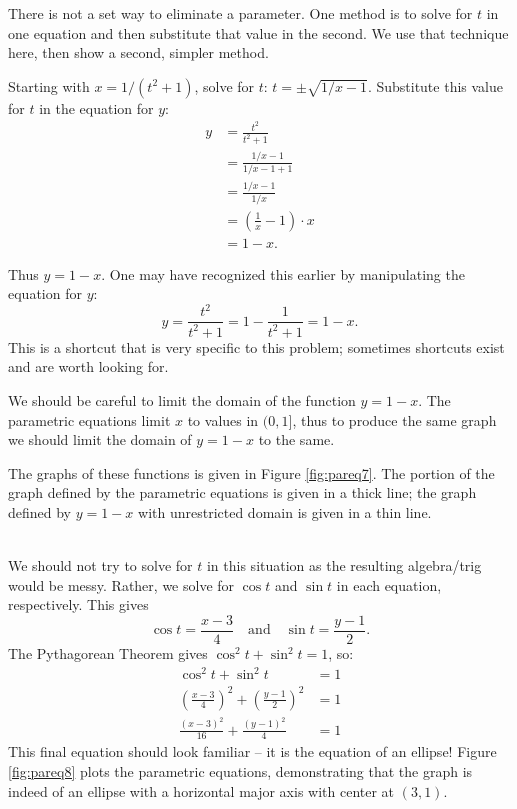 {There is not a set way to eliminate a parameter. One method is to solve for $t$ in one equation and then substitute that value in the second. We use that technique here, then show a second, simpler method.

Starting with $x= 1/(t^2+1)$, solve for $t$: $ t = \pm\sqrt{1/x-1}$. Substitute this value for $t$ in the equation for $y$:
\begin{align*}
 y &= \frac{t^2}{t^2 +1} \\
		&= \frac{1/x-1}{1/x-1+1} \\
		&= \frac{1/x - 1}{1/x} \\
		&= \left(\frac1x-1\right)\cdot x \\
		&= 1-x.
\end{align*}

Thus $y=1-x$. One may have recognized this earlier by manipulating the equation for $y$:
$$y = \frac{t^2}{t^2+1} = 1-\frac{1}{t^2+1} = 1-x.$$ This is a shortcut that is very specific to this problem; sometimes shortcuts exist and are worth looking for.

We should be careful to limit the domain of the function $y=1-x$. The parametric equations limit $x$ to values in $(0,1]$, thus to produce the same graph we should limit the domain of $y=1-x$ to the same. 

The graphs of these functions is given in Figure \ref{fig:pareq7}. The portion of the graph defined by the parametric equations is given in a thick line; the graph defined by $y=1-x$ with unrestricted domain is given in a thin line.
}\\

{We should not try to solve for $t$ in this situation as the resulting algebra/trig would be messy. Rather, we solve for $\cos t$ and $\sin t$ in each equation, respectively. This gives $$\cos t = \frac{x-3}{4} \quad \text{and}\quad \sin t=\frac{y-1}{2}.$$
The Pythagorean Theorem gives $\cos^2t+\sin^2t=1$, so:
\begin{align*}
\cos^2t+\sin^2t &=1 \\
\left(\frac{x-3}{4}\right)^2 +\left(\frac{y-1}{2}\right)^2 &=1\\
\frac{(x-3)^2}{16}+\frac{(y-1)^2}{4} &=1
\end{align*}
This final equation should look familiar -- it is the equation of an ellipse! Figure \ref{fig:pareq8} plots the parametric equations, demonstrating that the graph is indeed of an ellipse with a horizontal major axis with center at $(3,1)$. 
}\\

